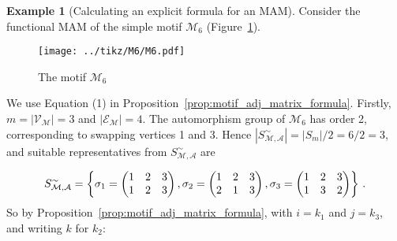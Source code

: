 \documentclass[12pt]{ociamthesis}
\theoremstyle{plain}
\theoremstyle{definition}
\newtheorem{example}{Example}[chapter]
\theoremstyle{remark}
\newcommand\ca[1]{\mathcal{#1}}
\begin{document}
\pagebreak

\begin{example}[Calculating an explicit formula for an MAM]
\label{ex:motif_adj_calc}
Consider the functional MAM of the simple motif $\ca{M}_6$
(Figure~\ref{fig:M6}).
%
\begin{figure}[H]
\centering
\texttt{[image: ../tikz/M6/M6.pdf]}
\caption{The motif $\ca{M}_6$}
\label{fig:M6}
\end{figure}
%
We use Equation (1) in Proposition~\ref{prop:motif_adj_matrix_formula}.
Firstly, $m = |\ca{V_M}| = 3$ and $|\ca{E_M}| = 4$. The automorphism group of
$\ca{M}_6$ has order 2, corresponding to swapping vertices 1 and 3. Hence
$|S_\ca{M,A}^\sim| = |S_m| / 2 = 6/2 = 3$, and suitable representatives from
$S_\ca{M,A}^\sim$ are

$$ S_\ca{M,A}^\sim = \left\{
%
\sigma_1 =
\begin{pmatrix}
1 & 2 & 3 \\
1 & 2 & 3
\end{pmatrix},
%
\sigma_2 =
\begin{pmatrix}
1 & 2 & 3 \\
2 & 1 & 3
\end{pmatrix},
%
\sigma_3 =
\begin{pmatrix}
1 & 2 & 3 \\
1 & 3 & 2
\end{pmatrix}
\right\}\,. \vspace*{0.2cm}$$
%
So by Proposition~\ref{prop:motif_adj_matrix_formula}, with $i=k_1$ and
$j=k_3$, and writing $k$ for $k_2$:


\end{example}
\end{document}
